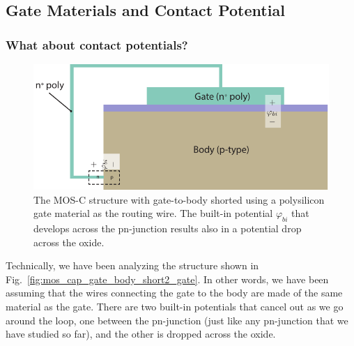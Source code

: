 \subsection{Gate Materials and Contact Potential}
\subsubsection{What about contact potentials?}
\begin{figure}[tbh]
\centering
\includegraphics[width=.75\columnwidth]{mos_cap_short_phibi}
\caption{The MOS-C structure with gate-to-body shorted using a polysilicon gate material as the routing wire.  The built-in potential $\varphi_{bi}$ that develops across the pn-junction results also in a  potential drop across the oxide.}
\label{fig:mos_cap_gate_body_short_gate}
\end{figure}
Technically, we have been analyzing the structure shown in Fig.~\ref{fig:mos_cap_gate_body_short2_gate}.  In other words, we have been assuming that the wires connecting the gate to the body are made of the same material as the gate.  There are two built-in potentials that cancel out as we go around the loop, one between the pn-junction (just like any pn-junction that we have studied so far), and the other is dropped across the oxide.  
